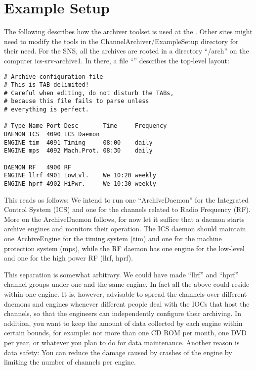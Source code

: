 \chapter{Example Setup} \label{ch:examplesetup}
The following describes how the archiver toolset is used at the
. Other sites might need to
modify the tools in the ChannelArchiver/ExampleSetup directory for their
need.
For the SNS, all the archives are rooted in a directory ``/arch'' on
the computer ics-srv-archive1.
In there, a file ``'' describes the top-level layout:
 
\begin{lstlisting}[frame=none,keywordstyle=\sffamily]
# Archive configuration file
# This is TAB delimited!
# Careful when editing, do not disturb the TABs,
# because this file fails to parse unless
# everything is perfect.

# Type Name Port Desc       Time     Frequency
DAEMON ICS  4090 ICS Daemon
ENGINE tim  4091 Timing     08:00    daily
ENGINE mps  4092 Mach.Prot. 08:30    daily

DAEMON RF   4900 RF
ENGINE llrf 4901 LowLvl.    We 10:20 weekly
ENGINE hprf 4902 HiPwr.     We 10:30 weekly
\end{lstlisting}

\noindent This reads as follows:
We intend to run one ``ArchiveDaemon'' for the Integrated Control
System (ICS) and one for the channels related to Radio Frequency (RF).
More on the ArchiveDaemon follows, for now let it suffice that a
daemon starts archive engines and monitors their operation.
The ICS daemon should maintain one ArchiveEngine for the timing system
(tim) and one for the machine protection system (mps),
while the RF daemon has one engine for the low-level and one for the
high power RF (llrf, hprf).

This separation is somewhat arbitrary. We could have made ``llrf'' and
``hprf'' channel groups under one and the same engine. In fact all the above
could reside within one engine. It is, however, advisable to spread the channels
over different daemons and engines whenever different people deal with
the IOCs that host the channels, so that the engineers can
independently configure their archiving. 
In addition, you want to keep the amount of data collected by each
engine within certain bounds, for example: not more than one CD ROM
per month, one DVD per year, or whatever you plan to do for data
maintenance. Another reason is data safety: You can reduce the damage
caused by crashes of the engine by limiting the number of channels per engine.

